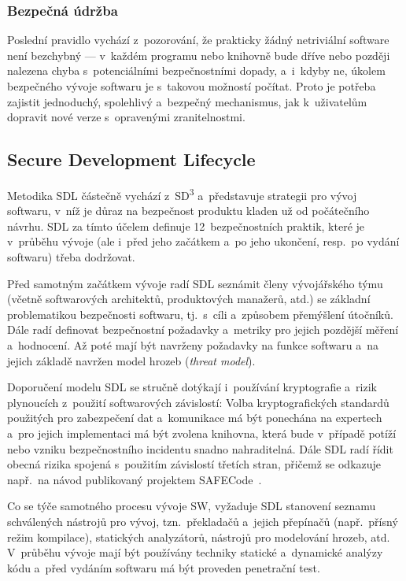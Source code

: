 \subsubsection*{Bezpečná údržba}

Poslední pravidlo vychází z~pozorování, že prakticky žádný netriviální software není bezchybný --- v~každém programu nebo knihovně bude dříve nebo později nalezena chyba s~potenciálními bezpečnostními dopady, a~i~kdyby ne, úkolem bezpečného vývoje softwaru je s~takovou možností počítat. Proto je potřeba zajistit jednoduchý, spolehlivý a~bezpečný mechanismus, jak k~u\-ži\-va\-te\-lům dopravit nové verze s~opravenými zranitelnostmi.

\subsection{Secure Development Lifecycle}

Metodika SDL částečně vychází z~SD\textsuperscript{3} a~představuje strategii pro vývoj softwaru, v~níž je důraz na bezpečnost produktu kladen už od počátečního návrhu. SDL za tímto účelem definuje 12~bezpečnostních praktik, které je v~průběhu vývoje (ale i~před jeho začátkem a~po jeho ukončení, resp.\ po vydání softwaru) třeba dodržovat.~\cite{mssdl}

Před samotným začátkem vývoje radí SDL seznámit členy vývojářského týmu (včetně softwarových architektů, produktových manažerů, atd.) se základní problematikou bezpečnosti softwaru, tj.\ s~cíli a~způsobem přemýšlení útočníků. Dále radí definovat bezpečnostní požadavky a~metriky pro jejich pozdější měření a~hodnocení. Až poté mají být navrženy požadavky na funkce softwaru a~na jejich základě navržen model hrozeb (\textit{threat model}).

Doporučení modelu SDL se stručně dotýkají i~používání kryptografie a~rizik plynoucích z~použití softwarových závislostí: Volba kryptografických standardů použitých pro zabezpečení dat a~komunikace má být ponechána na expertech a~pro jejich implementaci má být zvolena knihovna, která bude v~případě potíží nebo vzniku bezpečnostního incidentu snadno nahraditelná. Dále SDL radí řídit obecná rizika spojená s~použitím závislostí třetích stran, přičemž se odkazuje např.\ na návod publikovaný projektem SAFECode~\cite{safecodetpc}.

Co se týče samotného procesu vývoje SW, vyžaduje SDL stanovení seznamu schválených nástrojů pro vývoj, tzn.\ překladačů a~jejich přepínačů (např.\ přísný režim kompilace), statických analyzátorů, nástrojů pro modelování hrozeb, atd. V~průběhu vývoje mají být používány techniky statické a~dynamické analýzy kódu a~před vydáním softwaru má být proveden penetrační test.

